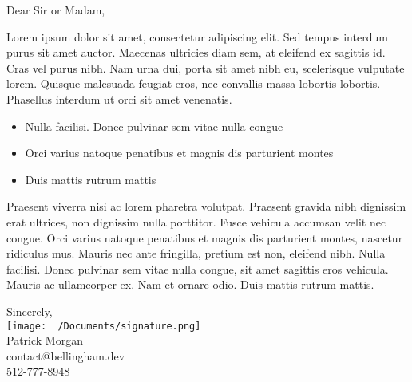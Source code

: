 \documentclass{letter}
\begin{document}
\begin{letter}{}
\opening{Dear Sir or Madam,}

Lorem ipsum dolor sit amet, consectetur adipiscing elit. Sed tempus interdum purus sit amet auctor. Maecenas ultricies diam sem, at eleifend ex sagittis id. Cras vel purus nibh. Nam urna dui, porta sit amet nibh eu, scelerisque vulputate lorem. Quisque malesuada feugiat eros, nec convallis massa lobortis lobortis. Phasellus interdum ut orci sit amet venenatis.

\begin{itemize}
  \item Nulla facilisi. Donec pulvinar sem vitae nulla congue
  \item Orci varius natoque penatibus et magnis dis parturient montes
  \item Duis mattis rutrum mattis
\end{itemize}

Praesent viverra nisi ac lorem pharetra volutpat. Praesent gravida nibh dignissim erat ultrices, non dignissim nulla porttitor. Fusce vehicula accumsan velit nec congue. Orci varius natoque penatibus et magnis dis parturient montes, nascetur ridiculus mus. Mauris nec ante fringilla, pretium est non, eleifend nibh. Nulla facilisi. Donec pulvinar sem vitae nulla congue, sit amet sagittis eros vehicula. Mauris ac ullamcorper ex. Nam et ornare odio. Duis mattis rutrum mattis.

\vspace{2\parskip} %
\begin{adjustwidth}{2.5in}{0in}
Sincerely, \\
\texttt{[image: ~/Documents/signature.png]} \\
Patrick Morgan \\
contact@bellingham.dev \\
512-777-8948
\end{adjustwidth}

\end{letter}
\end{document}
